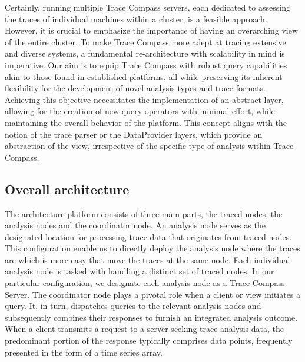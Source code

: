 Certainly, running multiple Trace Compass servers, each dedicated to assessing the traces of individual machines within a cluster, is a feasible approach. However, it is crucial to emphasize the importance of having an overarching view of the entire cluster. To make Trace Compass more adept at tracing extensive and diverse systems, a fundamental re-architecture with scalability in mind is imperative. Our aim is to equip Trace Compass with robust query capabilities akin to those found in established platforms, all while preserving its inherent flexibility for the development of novel analysis types and trace formats. Achieving this objective necessitates the implementation of an abstract layer, allowing for the creation of new query operators with minimal effort, while maintaining the overall behavior of the platform. This concept aligns with the notion of the trace parser or the DataProvider layers, which provide an abstraction of the view, irrespective of the specific type of analysis within Trace Compass.


\subsection{Overall architecture}

The architecture platform consists of three main parts, the traced nodes, the analysis nodes and the coordinator node. An analysis node serves as the designated location for processing trace data that originates from traced nodes. This configuration enable us to directly deploy the analysis node where the traces are which is more easy that move the traces at the same node. Each individual analysis node is tasked with handling a distinct set of traced nodes. In our particular configuration, we designate each analysis node as a Trace Compass Server. The coordinator node plays a pivotal role when a client or view initiates a query. It, in turn, dispatches queries to the relevant analysis nodes and subsequently combines their responses to furnish an integrated analysis outcome. When a client transmits a request to a server seeking trace analysis data, the predominant portion of the response typically comprises data points, frequently presented in the form of a time series array.

